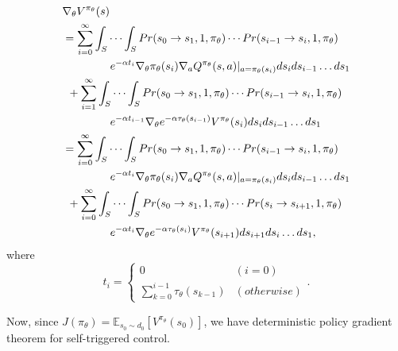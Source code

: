 \documentclass[english, dvipdfmx]{ampmt}             %
\newcommand{\expect}{\mathbb{E}}
\begin{document}
\begin{align}
	&\nabla_{\theta}V^{\pi_{\theta}}(s) \nonumber \\
	&= \sum_{i=0}^{\infty}\int_{S}\cdots\int_{S}Pr(s_0\to s_1,1,\pi_{\theta})\cdots Pr(s_{i-1}\to s_i,1,\pi_{\theta})\nonumber\\
	&\hspace{10ex}e^{-\alpha t_i}\nabla_{\theta}\pi_{\theta}(s_i)\nabla_aQ^{\pi_{\theta}}(s,a)|_{a=\pi_{\theta}(s_i)}ds_ids_{i-1}\ldots ds_1\nonumber\\
	&\hspace{1ex}+\sum_{i=1}^{\infty}\int_{S}\cdots\int_{S}Pr(s_0\to s_1,1,\pi_{\theta})\cdots Pr(s_{i-1}\to s_i,1,\pi_{\theta})\nonumber\\
	&\hspace{10ex}e^{-\alpha t_{i-1}}\nabla_{\theta}e^{-\alpha\tau_{\theta}(s_{i-1})}V^{\pi_{\theta}}(s_{i})ds_ids_{i-1}\ldots ds_1\nonumber\\
	&= \sum_{i=0}^{\infty}\int_{S}\cdots\int_{S}Pr(s_0\to s_1,1,\pi_{\theta})\cdots Pr(s_{i-1}\to s_i,1,\pi_{\theta})\nonumber\\
	&\hspace{10ex}e^{-\alpha t_i}\nabla_{\theta}\pi_{\theta}(s_i)\nabla_aQ^{\pi_{\theta}}(s,a)|_{a=\pi_{\theta}(s_i)}ds_ids_{i-1}\ldots ds_1\nonumber\\
	&\hspace{1ex}+\sum_{i=0}^{\infty}\int_{S}\cdots\int_{S}Pr(s_0\to s_1,1,\pi_{\theta})\cdots Pr(s_{i}\to s_{i+1},1,\pi_{\theta})\nonumber\\
	&\hspace{10ex}e^{-\alpha t_{i}}\nabla_{\theta}e^{-\alpha\tau_{\theta}(s_{i})}V^{\pi_{\theta}}(s_{i+1})ds_{i+1}ds_{i}\ldots ds_1,
\end{align}
where 
\begin{equation}
	t_i = \begin{cases}
    		0 & (i=0) \\
    		\sum_{k=0}^{i-1}\tau_{\theta}(s_{k-1}) & (otherwise)
  		\end{cases}.
\end{equation}\par
Now, since $J(\pi_{\theta}) = \expect_{s_0\sim d_0}[V^{\pi_{\theta}}(s_0)]$, we have deterministic policy gradient theorem for self-triggered control.
\end{document}
